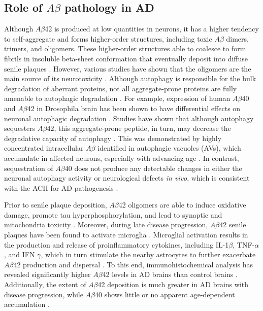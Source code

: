 \subsection{Role of $A\beta$ pathology in AD}
Although $A\beta$42 is produced at low quantities in neurons, it has a higher tendency to self-aggregate and forms higher-order structures, including toxic $A\beta$ dimers, trimers, and oligomers. These higher-order structures able to coalesce to form fibrils in insoluble beta-sheet conformation that eventually deposit into diffuse senile plaques \citep{Burdick1992,Gravina1995}. However, various studies have shown that the oligomers are the main source of its neurotoxicity \citep{Shankar2008,Shankar2009}. Although autophagy is responsible for the bulk degradation of aberrant proteins, not all aggregate-prone proteins are fully amenable to autophagic degradation \citep{Wong2008}. For example, expression of human $A\beta$40 and $A\beta$42 in Drosophila brain has been shown to have differential effects on neuronal autophagic degradation \citep{Ling2009}. Studies have shown that although autophagy sequesters $A\beta$42, this aggregate-prone peptide, in turn, may decrease the degradative capacity of autophagy \citep{Ling2014,Ling2011}. This was demonstrated by highly concentrated intracellular $A\beta$ identified in autophagic vacuoles (AVs), which accumulate in affected neurons, especially with advancing age \citep{Ling2011}. In contrast, sequestration of $A\beta$40 does not produce any detectable changes in either the neuronal autophagy activity or neurological defects \textit{in vivo}, which is consistent with the ACH for AD pathogenesis \citep{Hardy1992}.

Prior to senile plaque deposition, $A\beta$42 oligomers are able to induce oxidative damage, promote tau hyperphosphorylation, and lead to synaptic and mitochondria toxicity \citep{Kaminsky2015,Lustbader2004}. Moreover, during late disease progression, $A\beta$42 senile plaques have been found to activate microglia \citep{Rosenmann2013}. Microglial activation results in the production and release of proinflammatory cytokines, including IL-1$\beta$, TNF-$\alpha$, and IFN $\gamma$, which in turn stimulate the nearby astrocytes to further exacerbate $A\beta$42 production and dispersal \citep{DalPra2015}. To this end, immunohistochemical analysis has revealed significantly higher $A\beta$42 levels in AD brains than control brains \citep{Funato1998}. Additionally, the extent of $A\beta$42 deposition is much greater in AD brains with disease progression, while $A\beta$40 shows little or no apparent age-dependent accumulation \citep{Funato1998}.

